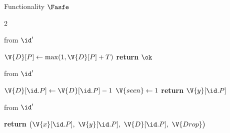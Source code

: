 \begin{interface}[nofloat]{Functionality $\Fasfe$ \\
}
{\begin{multicols}{2}
\columnbreak

 \quad from $\id'$
\begin{algorithmic}[1]
\algcont
{}
\State $\V{D}[P] \gets \max(1, \V{D}[P] + T)$ \label{ln:asfedelay}
\State \textbf{return} $\ok$
\algsave
\end{algorithmic}
\vspace{1.4ex}

 \quad from $\id'$
\begin{algorithmic}[1]
\algcont
{} \label{ln:asfeready}
\State $\V{D}[\id.P] \gets \V{D}[\id.P] - 1$ \label{ln:asfetick}
\State $\V{seen} \gets 1$ \label{ln:asfeseen}
\State \textbf{return} $\V{y}[\id.P]$
\algsave
\end{algorithmic}
\vspace{1.4ex}

 \quad from $\id'$
\begin{algorithmic}[1]
\algcont
\State \textbf{return} $\bigl(\V{x}[\id.P],\ \V{y}[\id.P],\ \V{D}[\id.P],\ \V{Drop}\bigr)$ \label{ln:asfeleakown}
\algsave
\end{algorithmic}
\end{multicols}}
\end{interface}
